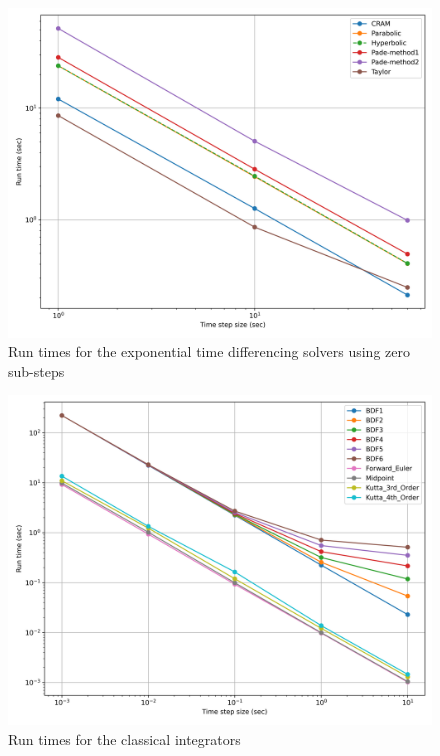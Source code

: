 \clearpage

\begin{figure}[p]
    \centering
    \includegraphics[width=5in]{images/chapter-5/caseStudies/neutronPrecursors/neutronPrecursorsMatExpRuntimes.png}
    \caption{Run times for the exponential time differencing solvers using zero sub-steps}
    \label{fig:neutron_precursors_mat_exp_runtimes}
\end{figure}

\clearpage

\begin{figure}[p]
    \centering
    \includegraphics[width=5in]{images/chapter-5/caseStudies/neutronPrecursors/neutronPrecursorsIntegratorRuntimes.png}
    \caption{Run times for the classical integrators}
    \label{fig:neutron_precursors_classical_integrators_runtimes}
\end{figure}

